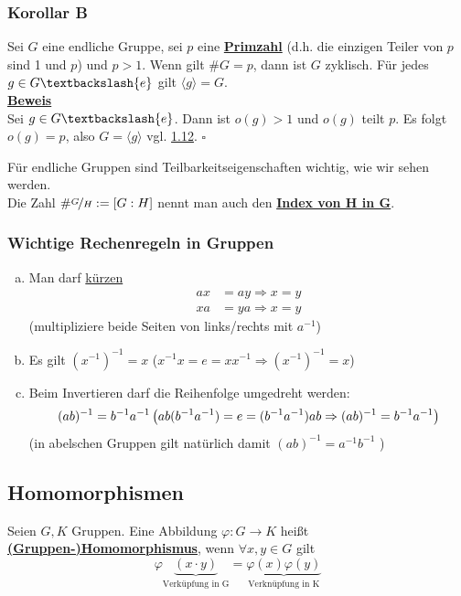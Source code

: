 \documentclass[a4paper, pagesize=pdftex, pdftex, twoside, headsepline, index=totoc,toc=listof, fontsize=10pt, cleardoublepage=empty, headinclude, DIV=13, BCOR=13mm]{scrartcl}
\newcommand{\bet}[1]{\uline{\textbf{#1}}} %
\newcommand{\Index}[1]{\uline{\textbf{#1}}\index{#1}} %
\newcommand{\enbrace}[1]{\ensuremath{\left( #1\right)}}
\newcommand{\lh}[1]{\langle #1 \rangle} %
\begin{document}
\subsubsection*{Korollar B}
Sei $G$ eine endliche Gruppe, sei $p$ eine \Index{Primzahl}  (d.h. die einzigen Teiler von $p$ sind 1 und $p$) und $p>1$. Wenn gilt $\#G=p$, dann ist $G$ zyklisch. Für jedes $g\in G \textbackslash\{e\}$ gilt $\lh{g}=G$.\\
\bet{Beweis}\\
Sei $g \in G\textbackslash\{e\}$. Dann ist $o(g)>1$ und $o(g)$ teilt $p$. Es folgt $o(g)=p$, also $G=\lh{g}$ vgl. \hyperref[sub:zyklische_gruppen]{1.12}.
\hfill $\square$

Für endliche Gruppen sind Teilbarkeitseigenschaften wichtig, wie wir sehen werden.\\
Die Zahl $\#\nicefrac{G}{H}:=[G:H]$ nennt man auch den \Index{Index von H in G}.

\subsubsection*{Wichtige Rechenregeln in Gruppen}
\begin{enumerate}[(a)]
	\item Man darf \uline{kürzen}
	\begin{equation*}
	\begin{aligned}
		ax &= ay \Rightarrow x=y\\
		xa &= ya \Rightarrow x=y
	\end{aligned}
	\end{equation*}
	(multipliziere beide Seiten von links/rechts mit $a^{-1}$)
	\item Es gilt $(x^{-1})^{-1}=x$   ($x^{-1}x=e=xx^{-1} \Rightarrow (x^{-1})^{-1}=x$)
	\item Beim Invertieren darf die Reihenfolge umgedreht werden:\\
	\[(ab)^{-1}=b^{-1}a^{-1}\\
	\enbrace{ab(b^{-1}a^{-1})=e=(b^{-1}a^{-1})ab \Rightarrow (ab)^{-1}=b^{-1}a^{-1}}
	\]
	(in abelschen Gruppen gilt natürlich damit $(ab)^{-1}=a^{-1}b^{-1}$ )
\end{enumerate}
\subsection{Homomorphismen}
\label{sub:homomorphismen}
Seien $G,K$ Gruppen. Eine Abbildung $\varphi: G \to K$ heißt \bet{(Gruppen-)Homomorphismus}, wenn $\forall x,y \in G$ gilt
\[\varphi\underbrace{(x\cdot y)}_{\text{Verküpfung in G} } =\underbrace{\varphi(x)\varphi(y)}_{\text{Verknüpfung in K}} \]
\end{document}
